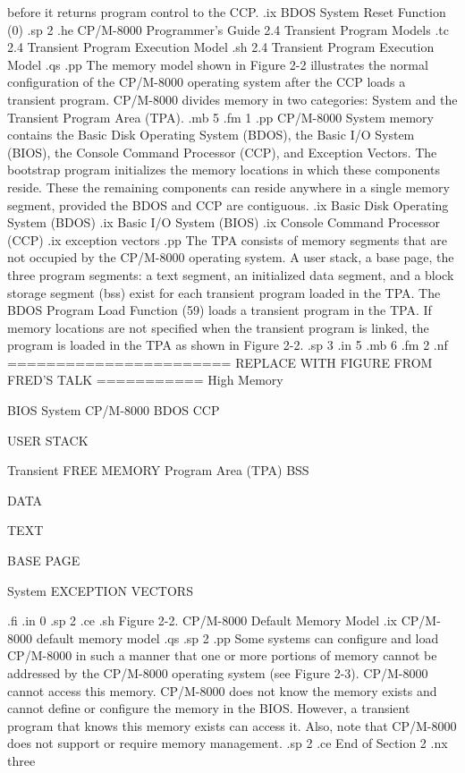 before it returns program control to the CCP.
.ix BDOS System Reset Function (0) 
.sp 2
.he CP/M-8000 Programmer's Guide         2.4  Transient Program Models
.tc    2.4  Transient Program Execution Model
.sh
2.4  Transient Program Execution Model
.qs
.pp
The memory model shown in Figure 2-2 illustrates the normal
configuration of the CP/M-8000 operating system after the CCP
loads a transient program.  CP/M-8000 divides memory in two categories: 
System and the Transient Program Area (TPA). 
.mb 5
.fm 1
.pp
CP/M-8000 System memory contains the Basic Disk Operating
System (BDOS), the Basic I/O System (BIOS), the Console Command
Processor (CCP), and Exception Vectors.  The bootstrap program
initializes the memory locations in which these
components reside.  These the remaining components can
reside anywhere in a single memory segment, provided the BDOS and CCP are
contiguous. 
.ix Basic Disk Operating System (BDOS)
.ix Basic I/O System (BIOS)
.ix Console Command Processor (CCP)
.ix exception vectors
.pp
The TPA consists of memory segments that are not
occupied by the CP/M-8000 operating system.  A user stack, a base
page, the three program segments: a text segment, an initialized
data segment, and a block storage segment (bss) exist for each
transient program loaded in the TPA.  The BDOS Program Load
Function (59) loads a transient program in the TPA.  If memory
locations are not specified when the transient program is linked,
the program is loaded in the TPA as shown in Figure 2-2. 
.sp 3
.in 5
.mb 6
.fm 2
.nf
======================= REPLACE WITH FIGURE FROM FRED'S TALK ===========
     High Memory
   
                                        BIOS                 
  System                 CP/M-8000       BDOS                 
                                        CCP                  
    
    
                             USER STACK                   


 Transient                   FREE MEMORY                    
  Program                                                
   Area      
   (TPA)                        BSS                        

                                DATA                      

                                TEXT                      

                              BASE PAGE                   


  System                  EXCEPTION VECTORS              


.fi
.in 0
.sp 2
.ce
.sh
     Figure 2-2.  CP/M-8000 Default Memory Model
.ix CP/M-8000 default memory model
.qs
.sp 2 
.pp 
Some systems can configure and load CP/M-8000 in such a manner that
one or more portions of memory cannot be addressed by the
CP/M-8000 operating system (see Figure 2-3).  CP/M-8000 cannot
access this memory.  CP/M-8000 does not know the memory 
exists and cannot define or configure the memory in the BIOS. 
However, a transient program that knows this memory exists can
access it.  Also, note that CP/M-8000 does not support or require
memory management.
.sp 2
.ce
End of Section 2
.nx three

